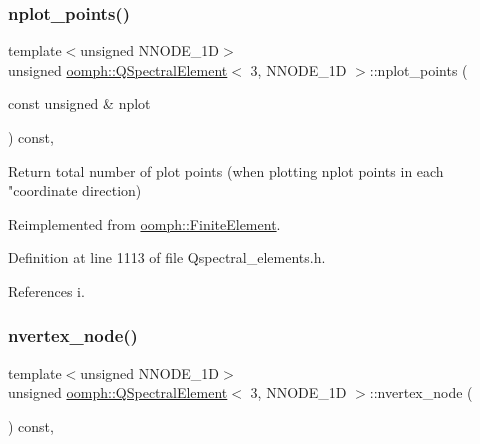 \subsubsection{\texorpdfstring{nplot\+\_\+points()}{nplot\_points()}}
{\footnotesize\ttfamily template$<$unsigned N\+N\+O\+D\+E\+\_\+1D$>$ \\
unsigned \hyperlink{classoomph_1_1QSpectralElement}{oomph\+::\+Q\+Spectral\+Element}$<$ 3, N\+N\+O\+D\+E\+\_\+1D $>$\+::nplot\+\_\+points (\begin{DoxyParamCaption}\item[{const unsigned \&}]{nplot }\end{DoxyParamCaption}) const\hspace{0.3cm}{\ttfamily [inline]}, {\ttfamily [virtual]}}



Return total number of plot points (when plotting nplot points in each "coordinate direction) 



Reimplemented from \hyperlink{classoomph_1_1FiniteElement_a8ed563c7ff0cfd8bafdbb0132b388106}{oomph\+::\+Finite\+Element}.



Definition at line 1113 of file Qspectral\+\_\+elements.\+h.



References i.

\mbox{\label{classoomph_1_1QSpectralElement_3_013_00_01NNODE__1D_01_4_aebf70850f2911827998b2e6c413a1b2a}} 
\subsubsection{\texorpdfstring{nvertex\+\_\+node()}{nvertex\_node()}}
{\footnotesize\ttfamily template$<$unsigned N\+N\+O\+D\+E\+\_\+1D$>$ \\
unsigned \hyperlink{classoomph_1_1QSpectralElement}{oomph\+::\+Q\+Spectral\+Element}$<$ 3, N\+N\+O\+D\+E\+\_\+1D $>$\+::nvertex\+\_\+node (\begin{DoxyParamCaption}{ }\end{DoxyParamCaption}) const\hspace{0.3cm}{\ttfamily [inline]}, {\ttfamily [virtual]}}



